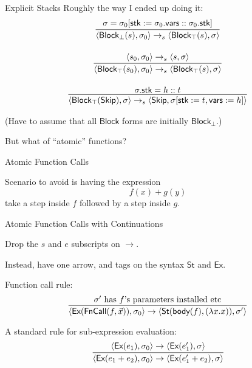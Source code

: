 \documentclass[compress,dvips,color=usenames,xcolor=dvipsnames]{beamer}
\begin{document}
\begin{frame}{Explicit Stacks}
Roughly the way I ended up doing it:
\[
\begin{array}{c}
\infer{
  \langle \textsf{Block}_\bot(s), \sigma_0 \rangle \rightarrow_s
  \langle \textsf{Block}_\top(s), \sigma\rangle
}{
  \sigma =
  \sigma_0[\textsf{stk} := \sigma_0.\textsf{vars} :: \sigma_0.\textsf{stk}]
}\\[5mm]
\infer{
  \langle \textsf{Block}_\top(s_0), \sigma_0\rangle \rightarrow_s
  \langle \textsf{Block}_\top(s), \sigma\rangle
}{
  \langle s_0,\sigma_0 \rangle \rightarrow_s \langle s, \sigma\rangle
}\\[5mm]
\infer{
  \langle\textsf{Block}_\top(\textsf{Skip}), \sigma\rangle
  \rightarrow_s
  \langle
     \textsf{Skip},
     \sigma[\textsf{stk} := t, \textsf{vars} := h]
  \rangle
}{\sigma.\textsf{stk} = h :: t}
\end{array}
\]

(Have to assume that all $\textsf{Block}$ forms are initially
$\textsf{Block}_\bot$.)

\bigskip
But what of ``atomic'' functions?
\end{frame}

\begin{frame}{Atomic Function Calls}

Scenario to avoid is having the expression
\[
f(x) + g(y)
\]
take a step inside $f$ followed by a step inside $g$.

\end{frame}

\begin{frame}{Atomic Function Calls with Continuations}

Drop the $s$ and $e$ subscripts on $\rightarrow$.

\medskip
Instead, have one arrow, and tags on the syntax $\textsf{St}$ and
$\textsf{Ex}$.

\medskip
Function call rule:
\[
\infer{
  \langle \textsf{Ex}(\textsf{FnCall}(f,\vec{x})), \sigma_0\rangle
  \rightarrow
  \langle \textsf{St}(\textsf{body}(f), (\lambda x. x)), \sigma'\rangle
}{
  \mbox{$\sigma'$ has $f$'s parameters installed etc}
}
\]

\medskip
A standard rule for sub-expression evaluation:
\[
\infer{
  \langle \textsf{Ex}(e_1 + e_2), \sigma_0 \rangle
  \rightarrow
  \langle \textsf{Ex}(e_1' + e_2), \sigma \rangle
}{
  \langle \textsf{Ex}(e_1), \sigma_0\rangle
  \rightarrow
  \langle \textsf{Ex}(e_1'), \sigma \rangle
}
\]


\end{frame}
\end{document}
